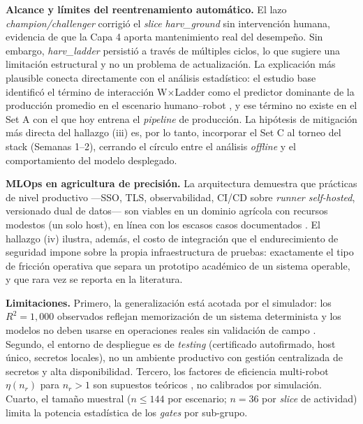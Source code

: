 \documentclass[conference]{IEEEtran}
\begin{document}
\textbf{Alcance y límites del reentrenamiento automático.} El lazo \textit{champion/challenger} corrigió el \textit{slice} \textit{harv\_ground} sin intervención humana, evidencia de que la Capa 4 aporta mantenimiento real del desempeño. Sin embargo, \textit{harv\_ladder} persistió a través de múltiples ciclos, lo que sugiere una limitación estructural y no un problema de actualización. La explicación más plausible conecta directamente con el análisis estadístico: el estudio base identificó el término de interacción W$\times$Ladder como el predictor dominante de la producción promedio en el escenario humano--robot \cite{garcia2026}, y ese término no existe en el Set A con el que hoy entrena el \textit{pipeline} de producción. La hipótesis de mitigación más directa del hallazgo (iii) es, por lo tanto, incorporar el Set C al torneo del stack (Semanas 1--2), cerrando el círculo entre el análisis \textit{offline} y el comportamiento del modelo desplegado.

\textbf{MLOps en agricultura de precisión.} La arquitectura demuestra que prácticas de nivel productivo —SSO, TLS, observabilidad, CI/CD sobre \textit{runner self-hosted}, versionado dual de datos— son viables en un dominio agrícola con recursos modestos (un solo host), en línea con los escasos casos documentados \cite{ozimek2026,arunkumar2025,autodrift2025,singh2025}. El hallazgo (iv) ilustra, además, el costo de integración que el endurecimiento de seguridad impone sobre la propia infraestructura de pruebas: exactamente el tipo de fricción operativa que separa un prototipo académico de un sistema operable, y que rara vez se reporta en la literatura.

\textbf{Limitaciones.} Primero, la generalización está acotada por el simulador: los $R^2 = 1{,}000$ observados reflejan memorización de un sistema determinista y los modelos no deben usarse en operaciones reales sin validación de campo \cite{garcia2026}. Segundo, el entorno de despliegue es de \textit{testing} (certificado autofirmado, host único, secretos locales), no un ambiente productivo con gestión centralizada de secretos y alta disponibilidad. Tercero, los factores de eficiencia multi-robot $\eta(n_r)$ para $n_r>1$ son supuestos teóricos \cite{emmi2014}, no calibrados por simulación. Cuarto, el tamaño muestral ($n\leq144$ por escenario; $n=36$ por \textit{slice} de actividad) limita la potencia estadística de los \textit{gates} por sub-grupo.

\end{document}
